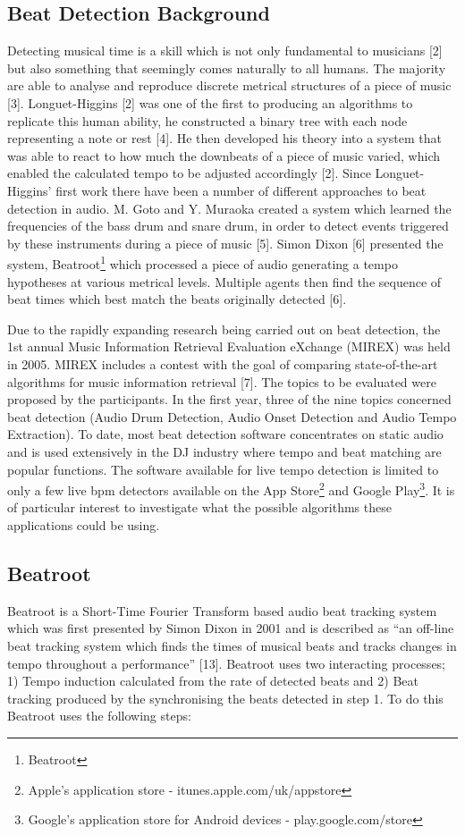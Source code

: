 \documentclass[a4paper, 11pt]{article}
\begin{document}
\subsection{Beat Detection Background}

Detecting musical time is a skill which is not only fundamental to musicians [2] but also something that seemingly comes naturally to all humans. The majority are able to analyse and reproduce discrete metrical structures of a piece of music [3]. Longuet-Higgins [2] was one of the first to producing an algorithms to replicate this human ability, he constructed a binary tree with each node representing a note or rest [4]. He then developed his theory into a system that was able to react to how much the downbeats of a piece of music varied, which enabled the calculated tempo to be adjusted accordingly [2]. Since Longuet-Higgins' first work there have been a number of different approaches to beat detection in audio. M. Goto and Y. Muraoka created a system which learned the frequencies of the bass drum and snare drum, in order to detect events triggered by these instruments during a piece of music [5]. Simon Dixon [6] presented the system, Beatroot\footnote{Beatroot } which processed a piece of audio generating a tempo hypotheses at various metrical levels. Multiple agents then find the sequence of beat times which best match the beats originally detected [6].

Due to the rapidly expanding research being carried out on beat detection, the 1st annual Music Information Retrieval Evaluation eXchange (MIREX) was held in 2005. MIREX includes a contest with the goal of comparing state-of-the-art algorithms for music information retrieval [7]. The topics to be evaluated were proposed by the participants. In the first year, three of the nine topics concerned beat detection (Audio Drum Detection, Audio Onset Detection and Audio Tempo Extraction). To date, most beat detection software concentrates on static audio and is used extensively in the DJ industry where tempo and beat matching are popular functions. The software available for live tempo detection is limited to only a few live bpm detectors available on the App Store\footnote{Apple's application store - itunes.apple.com/uk/appstore‎} and Google Play\footnote{Google's application store for Android devices - play.google.com/store}. It is of particular interest to investigate what the possible algorithms these applications could be using.


\subsection{Beatroot}
Beatroot is a Short-Time Fourier Transform based audio beat tracking system which was first presented by Simon Dixon in 2001 and is described as ``an off-line beat tracking system which finds the times of musical beats and tracks changes in tempo throughout a performance'' [13]. Beatroot uses two interacting processes; 1) Tempo induction calculated from the rate of detected beats and 2) Beat tracking produced by the synchronising the beats detected in step 1. To do this Beatroot uses the following steps:
\end{document}
